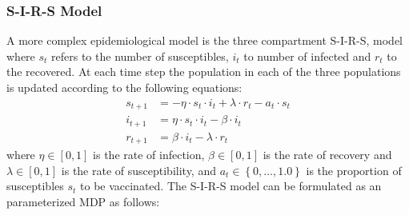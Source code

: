 \subsubsection{S-I-R-S Model}
\label{sec:results_influenza_sirs}

A more complex epidemiological model is the three compartment S-I-R-S, model where {\footnotesize $ s_t $} refers to the number of susceptibles, {\footnotesize $ i_t $} to number of infected and {\footnotesize $ r_t $} to the recovered. At each time step the population in each of the three populations is updated according to the following equations:
{\footnotesize
\begin{align*}
    s_{t + 1} &= -\eta \cdot s_t \cdot i_t + \lambda \cdot r_t - a_t \cdot s_t \\
    i_{t + 1} &= \eta \cdot s_t \cdot i_t - \beta \cdot i_t \\
    r_{t+1} &= \beta \cdot i_t - \lambda \cdot r_t 
\end{align*}
}
where {\footnotesize $ \eta \in [0, 1]$} is the rate of infection, {\footnotesize $ \beta \in [0, 1]$} is the rate of recovery and {\footnotesize $ \lambda \in [0, 1]$} is the rate of susceptibility, and {\footnotesize $ a_t \in \left\lbrace 0, \ldots, 1.0\right\rbrace $} is the proportion of susceptibles {\footnotesize $ s_t $} to be vaccinated. The S-I-R-S model can be formulated as an parameterized MDP as follows:
